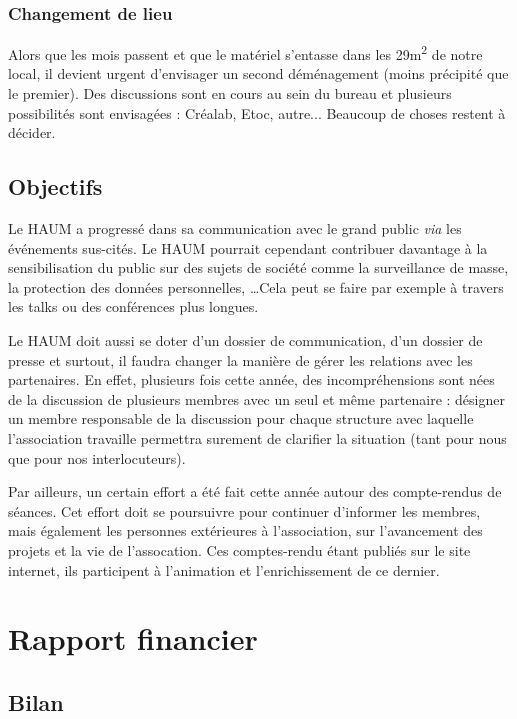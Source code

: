 \documentclass[11pt]{article}
\begin{document}
\subsubsection{Changement de lieu}

Alors que les mois passent et que le matériel s'entasse dans les 29m\textsuperscript{2} de notre local, il devient
urgent d'envisager un second déménagement (moins précipité que le premier). Des discussions sont en cours au sein du bureau et plusieurs
possibilités sont envisagées : Créalab, Etoc, autre... Beaucoup de choses restent à décider.

\subsection{Objectifs}

Le HAUM a progressé dans sa communication avec le grand public \textit{via} les événements sus-cités. Le HAUM pourrait cependant contribuer davantage à la sensibilisation du public sur
des sujets de société comme la surveillance de masse, la protection des données personnelles, \ldots Cela peut se faire
par exemple à travers les talks ou des conférences plus longues.

\medskip

Le HAUM doit aussi se doter d'un dossier de communication, d'un dossier de presse et surtout, il faudra changer la manière de gérer les relations avec les partenaires.
En effet, plusieurs fois cette année, des incompréhensions sont nées de la discussion de plusieurs membres avec un seul
et même partenaire : désigner un membre responsable de la discussion pour chaque structure avec laquelle l'association
travaille permettra surement de clarifier la situation (tant pour nous que pour nos interlocuteurs).

Par ailleurs, un certain effort a été fait cette année autour des compte-rendus de séances. Cet effort doit se
poursuivre pour continuer d'informer les membres, mais également les personnes extérieures à l'association, sur
l'avancement des projets et la vie de l'assocation. Ces comptes-rendu étant publiés sur le site internet, ils
participent à l'animation et l'enrichissement de ce dernier.

\section{Rapport financier}

\subsection{Bilan}
\end{document}
